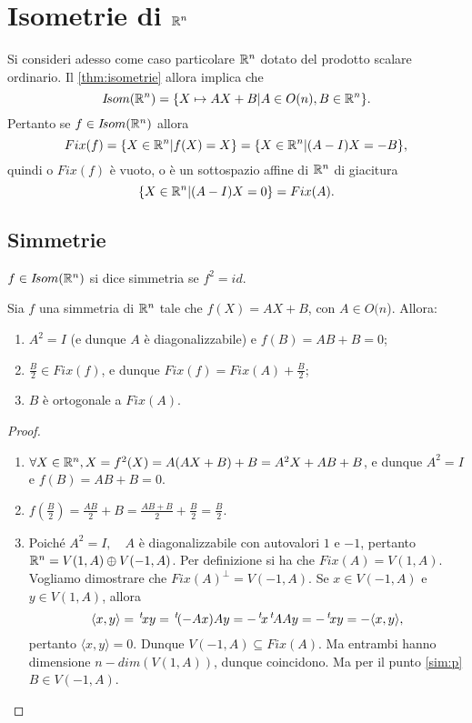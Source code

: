  
\section{Isometrie di $\mathbb R^n$}
 
 Si consideri adesso come caso particolare $\mathbb R^n$ dotato del prodotto scalare ordinario.
 Il \cref{thm:isometrie} allora implica che
 \[
	I\!som( \mathbb R^n)=\{X\mapsto AX+B|A\in O(n),B\in \mathbb R^n\}.
 \]
 Pertanto se $f\in I\!som( \mathbb R^n)$ allora
 \[
	Fix(f)=\{X\in \mathbb R^n|f(X)=X\}=\{X\in \mathbb R^n|(A-I)X=-B\},
 \]
 quindi o $Fix(f)$ è vuoto, o è un sottospazio affine di $\mathbb R^n$ di giacitura
 \[
	\{X\in \mathbb R^n|(A-I)X=0\}=Fix(A).
 \]
 
 
\subsection{Simmetrie}
 
 \begin{definition}
	$f\in I\!som( \mathbb R^n)$ si dice simmetria se $f^2=id$.
\end{definition}
 
 \begin{proposition}
 Sia $f$ una simmetria di $\mathbb R^n$ tale che $f(X)=AX+B$, con $A\in O(n$).
 Allora:
 \begin{enumerate}[label=\bf\Roman*)]
	\item $A^2=I$ (e dunque $A$ è diagonalizzabile) e $f(B)=AB+B=0$;\label{sim:p}
	\item $\frac{B}{2}\in Fix(f)$, e dunque $Fix(f)=Fix(A)+\frac{B}{2}$;
	\item $B$ è ortogonale a $Fix(A)$.
 \end{enumerate}
 \end{proposition}
 
 \begin{proof}
 \begin{enumerate}[label=\bf\Roman*)]
 \item $\forall X\in \mathbb R^n,  X=f^2(X)=A(AX+B)+B=A^2X+AB+B$, e dunque
 $A^2=I$ e $f(B)=AB+B=0$.
 \item $f(\frac{B}{2})=\frac{AB}{2}+B=\frac{AB+B}{2}+\frac{B}{2}=\frac{B}{2}$.
 \item Poiché $A^2=I,\quad A$ è diagonalizzabile con autovalori $1$ e $-1$, pertanto
 $\mathbb R^n=V(1,A)\oplus V(-1,A)$. Per definizione si ha che $Fix(A)=V(1,A)$.
 Vogliamo dimostrare che $Fix(A)^{\bot}=V(-1,A)$.  Se $x\in V(-1,A)$ e $y\in V(1,A)$, allora 
  \[
   \langle x,y\rangle=\, ^{t}\!xy=\, ^{t}\!(-Ax)Ay=-\, ^{t}\!x\, ^{t}\!AAy=-\, ^{t}\!xy= -\langle x,y\rangle,
  \]
 pertanto $\langle x,y\rangle=0.$
 Dunque $V(-1,A)\subseteq Fix(A)$. Ma entrambi hanno dimensione
 $n-dim(V(1,A))$, dunque coincidono.
 Ma per il punto \ref{sim:p} $B\in V(-1,A)$.
 \end{enumerate}
 \end{proof}

